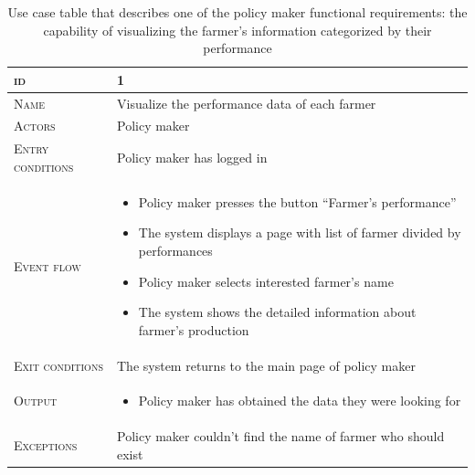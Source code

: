 \begin{table}[H]
    \centering
    \begin{tabular}{|l|p{}|}
        \hline %
    	\textsc{id}                 &   1\\
    	\hline %
    	\textsc{Name}               &   Visualize the performance data of each farmer\\
    	\hline %
    	\textsc{Actors}             &   Policy maker\\
    	\hline %
    	\textsc{Entry conditions}   &   Policy maker has logged in\\
    	\hline %
    	\textsc{Event flow}         &   \footnotesize
            	                        \begin{itemize}
                                    	    \item Policy maker presses the button “Farmer’s performance”
                                    		\item The system displays a page with list of farmer divided by performances
                                    		\item Policy maker selects interested farmer’s name
                                    		\item The system shows the detailed information about farmer’s production
                                        \end{itemize}\\
        \hline %
        \textsc{Exit conditions}    &  The system returns to the main page of policy maker\\
    	\hline %
    	\textsc{Output}             &  \begin{itemize}
    	    \item Policy maker has obtained the data they were looking for
    	\end{itemize}\\
    	\hline %
    	\textsc{Exceptions}         &  Policy maker couldn’t find the name of farmer who should exist\\
    	\hline %
        
    \end{tabular}
    \caption{\label{tab:visualize_farmer_performance}Use case table that describes one of the policy maker functional requirements:  the capability of visualizing the farmer's information categorized by their performance} %
\end{table}

